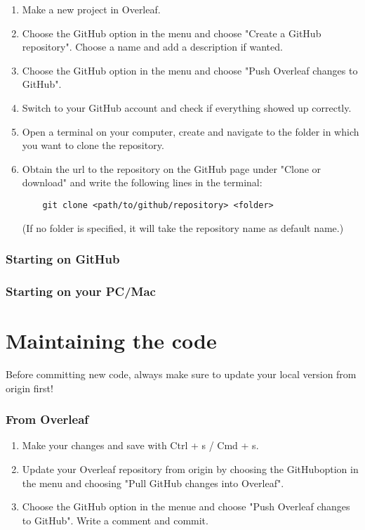 \documentclass{article}
\begin{document}
\begin{enumerate}
    \item Make a new project in Overleaf.
    \item Choose the GitHub option in the menu and choose "Create a GitHub repository". Choose a name and add a description if wanted.
    \item Choose the GitHub option in the menu and choose "Push Overleaf changes to GitHub".
    \item Switch to your GitHub account and check if everything showed up correctly.
    \item Open a terminal on your computer, create and navigate to the folder in which you want to clone the repository.
    \item Obtain the url to the repository on the GitHub page under "Clone or download" and write the following lines in the terminal: 
    \begin{verbatim}
    git clone <path/to/github/repository> <folder>
    \end{verbatim}
    (If no folder is specified, it will take the repository name as default name.)
\end{enumerate}

\subsubsection{Starting on GitHub}

\subsubsection{Starting on your PC/Mac}

\section{Maintaining the code}

Before committing new code, always make sure to update your local version from origin first!

\subsubsection{From Overleaf}

\begin{enumerate}
    \item Make your changes and save with Ctrl + s / Cmd + s.
    \item Update your Overleaf repository from origin by choosing the GitHuboption in the menu and choosing "Pull GitHub changes into Overleaf".
    \item Choose the GitHub option in the menue and choose "Push Overleaf changes to GitHub". Write a comment and commit.
\end{enumerate}
\end{document}
